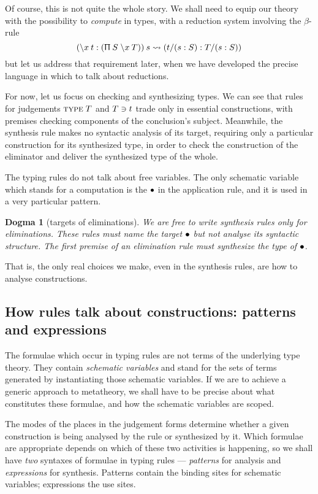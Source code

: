 \documentclass{jfp1}
\newtheorem{dogma}[theorem]{Dogma}
\begin{document}
Of course, this is not quite the whole story. We shall need to equip our theory
with the possibility to \emph{compute} in types, with a reduction system involving
the $\beta$-rule
\[
  (\backslash x\:t : (\Uppi\:S\;\backslash x\:{T}))\:s \rightsquigarrow (t/(s:S):T/(s:S))
\]
but let us address that requirement later, when we have developed the precise
language in which to talk about reductions.

For now, let us focus on checking and synthesizing types. We can see that
rules for judgements $\textsc{type}\;T$ and $T \ni t$ trade only in essential constructions,
with premises checking components of the conclusion's subject. Meanwhile, the synthesis
rule makes no syntactic analysis of its target, requiring only a particular construction
for its synthesized type, in order to check the construction of the eliminator
and deliver the synthesized type of the whole.

The typing rules do not talk about free variables. The only schematic variable
which stands for a computation is the $\bullet$ in the application rule, and it is used in a
very particular pattern.

\begin{dogma}[targets of eliminations]
  We are free to write synthesis rules only for eliminations. These rules must
  name the target $\bullet$ but not analyse its syntactic structure. The first premise
  of an elimination rule must synthesize the type of $\bullet$.
\end{dogma}

That is, the only real choices we make, even in the synthesis rules, are how to
analyse constructions.


\subsection{How rules talk about constructions: patterns and expressions}

The formulae which occur in typing rules are not terms of the underlying
type theory. They contain \emph{schematic variables} and stand for the sets
of terms generated by instantiating those schematic variables. If we are
to achieve a generic approach to metatheory, we shall have to be precise
about what constitutes these formulae, and how the schematic variables are
scoped.

The modes of the places in the judgement forms determine whether a given
construction is being analysed by the rule or synthesized by it. Which formulae
are appropriate depends on which of these two activities is happening, so
we shall have \emph{two} syntaxes of formulae in typing rules --- \emph{patterns}
for analysis and \emph{expressions} for synthesis. Patterns contain the
binding sites for schematic variables; expressions the use sites.
\end{document}
